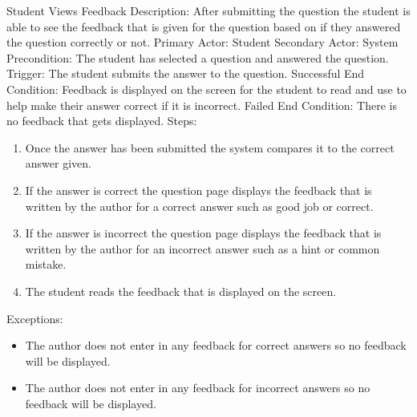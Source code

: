     
    \begin{section}{Student Views Feedback}
        Description: After submitting the question the student is able to see the feedback that is given for the 
        question based on if they answered the question correctly or not. \newline
        Primary Actor: Student \newline
        Secondary Actor: System \newline
        Precondition: The student has selected a question and answered the question. \newline
        Trigger: The student submits the answer to the question. \newline
        Successful End Condition: Feedback is displayed on the screen for the student 
        to read and use to help make their answer correct if it is incorrect. \newline
        Failed End Condition: There is no feedback that gets displayed. \newline
        \newline
        Steps:
        \begin{enumerate}
            \item{Once the answer has been submitted the system compares it to the correct answer given.}
            \item{If the answer is correct the question page displays the feedback that is 
            written by the author for a correct answer such as good job or correct.}
            \item{If the answer is incorrect the question page displays the feedback that is 
            written by the author for an incorrect answer such as a hint or common mistake.}
            \item{The student reads the feedback that is displayed on the screen.}
        \end{enumerate}
        Exceptions:
        \begin{itemize}
            \item{The author does not enter in any feedback for correct answers so no feedback will be displayed.}
            \item{The author does not enter in any feedback for incorrect answers so no feedback will be displayed.}
        \end{itemize}
    \end{section}
        
